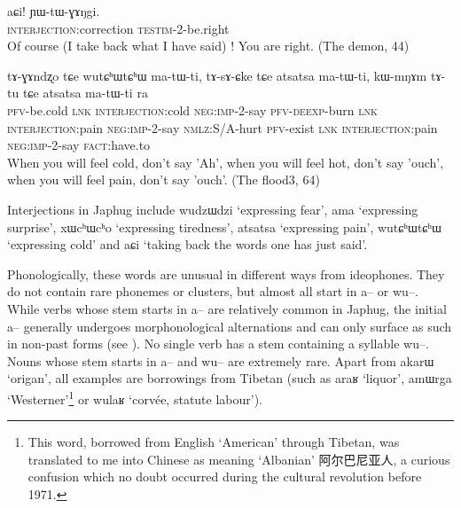 \documentclass[oldfontcommands,oneside,a4paper,11pt]{article}
\newcommand{\ipa}[1]{{\phon \mbox{#1}}} %
\newcommand{\zh}[1]{{\cn #1}}
\begin{document}
       \begin{exe}
\ex \label{ex:aCi}
\gll 
\ipa{aɕi!} 	\ipa{ɲɯ-tɯ-ɣɤŋgi.} \\
\textsc{interjection}:correction \textsc{testim}-2-be.right \\
\glt Of course (I take back what I have said) ! You are right. (The demon, 44)
\end{exe}
      \begin{exe}
\ex \label{ex:atsatsa}
\gll 
 	\ipa{tɤ-ɣɤndʐo} 	\ipa{tɕe} 	\ipa{wutɕʰɯtɕʰɯ} 	\ipa{ma-tɯ-ti,} 	\ipa{tɤ-sɤ-ɕke} 	\ipa{tɕe} 	 	\ipa{atsatsa} 	\ipa{ma-tɯ-ti,}  \ipa{kɯ-mŋɤm} 	\ipa{tɤ-tu} 	\ipa{tɕe} 	\ipa{atsatsa} 	\ipa{ma-tɯ-ti} 	\ipa{ra} \\
 	\textsc{pfv}-be.cold \textsc{lnk} \textsc{interjection}:cold \textsc{neg:imp}-2-say \textsc{pfv-deexp}-burn \textsc{lnk} \textsc{interjection}:pain \textsc{neg:imp}-2-say \textsc{nmlz}:S/A-hurt \textsc{pfv}-exist \textsc{lnk} \textsc{interjection}:pain \textsc{neg:imp}-2-say \textsc{fact}:have.to  	\\
\glt When you will feel cold, don't say 'Ah', when you will feel hot, don't say 'ouch', when you will feel pain, don't say 'ouch'. (The flood3, 64)
\end{exe}
  
 Interjections in Japhug include  \ipa{wudzɯdzi} `expressing fear',  \ipa{ama} `expressing surprise', \ipa{xɯcʰɯcʰo} `expressing tiredness', \ipa{atsatsa} `expressing pain', \ipa{wutɕʰɯtɕʰɯ} `expressing cold' and \ipa{aɕi} `taking back the words one has just said'.
 
 Phonologically, these words are unusual in different ways from ideophones. They do not contain rare phonemes or clusters, but almost all start in \ipa{a--} or \ipa{wu--}. While verbs whose stem starts  in \ipa{a--} are relatively common in Japhug, the initial \ipa{a--} generally undergoes   morphonological alternations and can only surface as such in non-past forms (see \citealt{jacques07passif}).  No   single verb has a stem containing  a syllable \ipa{wu--}. Nouns whose stem starts in \ipa{a--} and \ipa{wu--}   are extremely rare. Apart from \ipa{akarɯ} `origan', all examples are borrowings from Tibetan (such as \ipa{araʁ} `liquor', \ipa{amɯrga} `Westerner'\footnote{This word, borrowed from English `American' through Tibetan, was translated to me into Chinese as meaning `Albanian' \zh{阿尔巴尼亚人},  a curious confusion which no doubt occurred during the cultural revolution before 1971.} or \ipa{wulaʁ} `corvée, statute labour').
\end{document}
